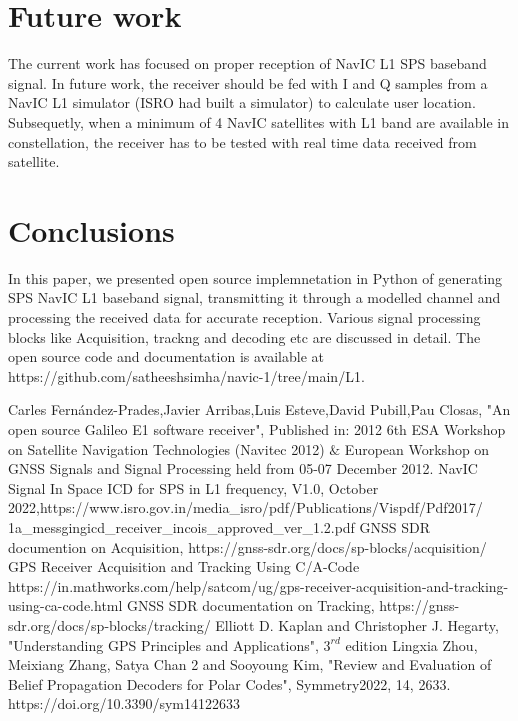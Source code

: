 \documentclass[conference]{IEEEtran}
\begin{document}
\section {Future work}
The current work has focused on proper reception of NavIC L1 SPS baseband signal. In future work, 
the receiver should be fed with I and Q samples from a NavIC L1 simulator (ISRO had built a 
simulator) to calculate user location. Subsequetly, when a minimum of 4 NavIC satellites with L1 
band are available in constellation, the receiver has to be tested with real time data received 
from satellite.
\section {Conclusions}
In this paper, we presented open source implemnetation in Python of generating SPS NavIC L1 baseband 
signal, transmitting it through a modelled channel and processing the received data for accurate reception.
Various signal processing blocks like Acquisition, trackng and decoding  etc are discussed in detail. The open source
code and documentation is available at https://github.com/satheeshsimha/navic-1/tree/main/L1.

\begin{thebibliography}{00}
 Carles Fernández-Prades,Javier Arribas,Luis Esteve,David Pubill,Pau Closas, "An open source Galileo E1 software receiver", Published in: 2012 6th ESA Workshop on Satellite Navigation Technologies (Navitec 2012) $\&$ European Workshop on GNSS Signals and Signal Processing held from 05-07 December 2012.
 NavIC Signal In Space ICD for SPS in L1 frequency, V1.0, October 2022,https://www.isro.gov.in/media\_isro/pdf/Publications/Vispdf/Pdf2017/\\1a\_messgingicd\_receiver\_incois\_approved\_ver\_1.2.pdf
 GNSS SDR documention on Acquisition, https://gnss-sdr.org/docs/sp-blocks/acquisition/
 GPS Receiver Acquisition and Tracking Using C/A-Code https://in.mathworks.com/help/satcom/ug/gps-receiver-acquisition-and-tracking-using-ca-code.html
 GNSS SDR documentation on Tracking, https://gnss-sdr.org/docs/sp-blocks/tracking/
 Elliott D. Kaplan and Christopher J. Hegarty,  "Understanding {GPS} {P}rinciples and {A}pplications", $3^{rd}$ edition
 Lingxia Zhou, Meixiang Zhang, Satya Chan 2 and Sooyoung Kim, "Review and Evaluation of Belief Propagation Decoders for Polar Codes", Symmetry2022, 14, 2633. https://doi.org/10.3390/sym14122633
\end{thebibliography}
\vspace{12pt}
\end{document}
